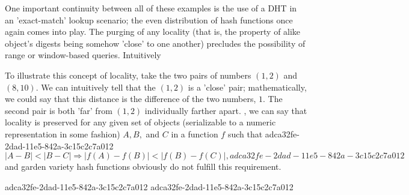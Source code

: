 \documentclass[12pt]{article}
\begin{document}
\par One important continuity between all of these examples is the use of a DHT in an 'exact-match' lookup scenario; the even distribution of hash functions once again comes into play. The purging of any locality (that is, the property of alike object's digests being somehow 'close' to one another) precludes the possibility of range or window-based queries. Intuitively

\par To illustrate this concept of locality, take the two pairs of numbers $(1,2)$ and $(8,10)$. We can intuitively tell that the $(1,2)$ is a 'close' pair; mathematically, we could say that this distance is the difference of the two numbers, $1$. The second pair is both 'far' from $(1,2)$ individually farther apart. , we can say that locality is preserved for any given set of objects (serializable to a numeric representation in some fashion) $A,B,$ and $C$ in a function $f$ such that
adca32fe-2dad-11e5-842a-3c15c2c7a012\begin{equation}
|A-B| < |B-C| \Rightarrow |f(A)-f(B)| < |f(B) - f(C)|,
adca32fe-2dad-11e5-842a-3c15c2c7a012\end{equation}
and garden variety hash functions obviously do not fulfill this requirement.

adca32fe-2dad-11e5-842a-3c15c2c7a012\printbibliography
adca32fe-2dad-11e5-842a-3c15c2c7a012
\end{document}
